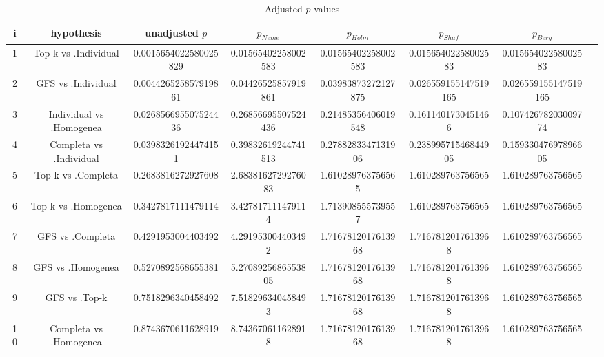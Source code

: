 \documentclass[a4paper,10pt]{article}
\begin{document}
\begin{landscape}
\begin{table}[!htp]
\centering\tiny
\caption{Adjusted $p$-values}
\begin{tabular}{cccccccc}
i&hypothesis&unadjusted $p$&$p_{Neme}$&$p_{Holm}$&$p_{Shaf}$&$p_{Berg}$\\
\hline
1&Top-k vs .Individual&0.0015654022580025829&0.01565402258002583&0.01565402258002583&0.01565402258002583&0.01565402258002583\\
2&GFS vs .Individual&0.004426525857919861&0.04426525857919861&0.03983873272127875&0.026559155147519165&0.026559155147519165\\
3&Individual vs .Homogenea&0.026856695507524436&0.26856695507524436&0.21485356406019548&0.1611401730451466&0.10742678203009774\\
4&Completa vs .Individual&0.03983261924474151&0.39832619244741513&0.2788283347131906&0.23899571546844905&0.15933047697896605\\
5&Top-k vs .Completa&0.2683816272927608&2.6838162729276083&1.610289763756565&1.610289763756565&1.610289763756565\\
6&Top-k vs .Homogenea&0.3427817111479114&3.427817111479114&1.713908555739557&1.610289763756565&1.610289763756565\\
7&GFS vs .Completa&0.4291953004403492&4.291953004403492&1.7167812017613968&1.7167812017613968&1.610289763756565\\
8&GFS vs .Homogenea&0.5270892568655381&5.2708925686553805&1.7167812017613968&1.7167812017613968&1.610289763756565\\
9&GFS vs .Top-k&0.7518296340458492&7.518296340458493&1.7167812017613968&1.7167812017613968&1.610289763756565\\
10&Completa vs .Homogenea&0.8743670611628919&8.743670611628918&1.7167812017613968&1.7167812017613968&1.610289763756565\\
\hline
\end{tabular}
\end{table}

\end{landscape}
\end{document}
